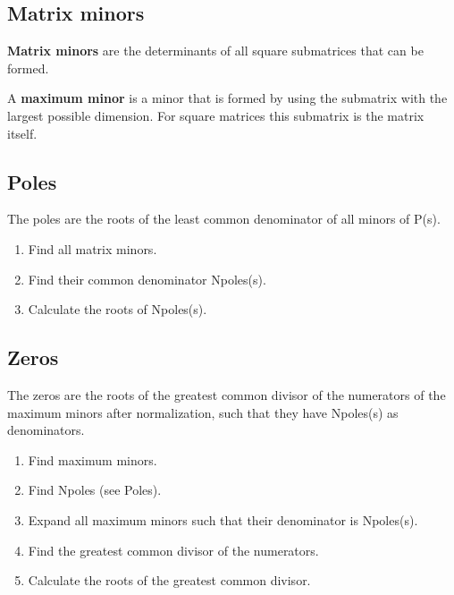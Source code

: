 \documentclass[10pt,a4paper]{scrartcl}
\begin{document}
\begin{multicols*}{3}
	\subsection{Matrix minors}
	
	\textbf{Matrix minors} are the determinants of all square submatrices that can be formed.
	
	A \textbf{maximum minor} is a minor that is formed by using the submatrix with the largest possible dimension. For square matrices this submatrix is the matrix itself.
	
	\subsection{Poles}
	
	The poles are the roots of the least common denominator of all minors of P(s).
	
	
	\begin{enumerate}
	\compaq
	\item Find all matrix minors.
	\item Find their common denominator Npoles(s).
	\item Calculate the roots of Npoles(s).
	\end{enumerate}
	
	
	\subsection{Zeros}
	
	The zeros are the roots of the greatest common divisor of the numerators of the maximum minors after normalization, such that they have Npoles(s) as denominators.

	
	\begin{enumerate}
	\compaq
	\item Find maximum minors.
	\item Find Npoles (see Poles).
	\item Expand all maximum minors such that their denominator is Npoles(s).
	\item Find the greatest common divisor of the numerators.
	\item Calculate the roots of the greatest common divisor.
	\end{enumerate} 
	

\end{multicols*}
\end{document}
